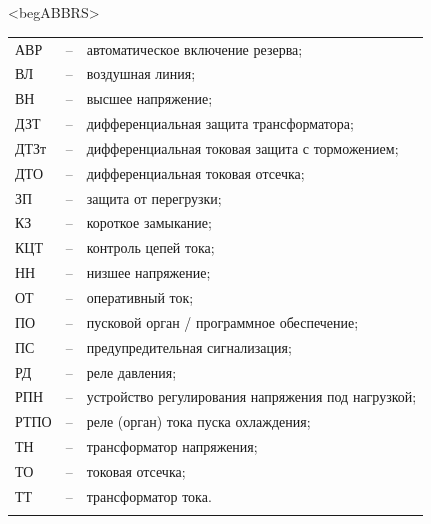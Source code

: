 \color{unimain}\section*{}
{\color{white}\fontsize{0.1pt}{0.1pt}\selectfont<begABBRS>}
\color{black}
\begin{longtable}{>{\raggedright\arraybackslash}m{2cm}>{\raggedright\arraybackslash}m{0.5cm}>{\raggedright\arraybackslash}m{20cm}}
\endfirsthead\endhead\endfoot\endlastfoot
АВР & -- & автоматическое включение резерва; \\
ВЛ & -- & воздушная линия; \\
ВН & -- & высшее напряжение; \\
ДЗТ & -- & дифференциальная защита трансформатора; \\
ДТЗт & -- & дифференциальная токовая защита с торможением; \\
ДТО & -- & дифференциальная токовая отсечка; \\
ЗП & -- & защита от перегрузки; \\
КЗ & -- & короткое замыкание; \\
КЦТ & -- & контроль цепей тока; \\
НН & -- & низшее напряжение; \\
ОТ & -- & оперативный ток; \\
ПО & -- & пусковой орган / программное обеспечение; \\
ПС & -- & предупредительная сигнализация; \\
РД & -- & реле давления; \\
РПН & -- & устройство регулирования напряжения под нагрузкой; \\
РТПО & -- & реле (орган) тока пуска охлаждения; \\
ТН & -- & трансформатор напряжения; \\
ТО & -- & токовая отсечка; \\
ТТ & -- & трансформатор тока. \\
{\color{white}\fontsize{0.1pt}{0.1pt}\selectfont<endABBRS>}
\end{longtable}
